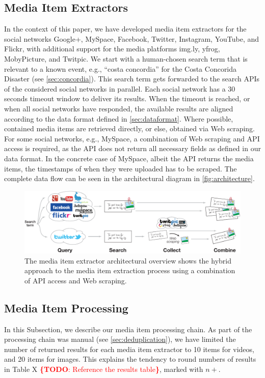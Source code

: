 \documentclass{acm_proc_article-sp}
\newcommand{\todo}[1]{\noindent\textcolor{red}{{\bf \{TODO}: #1{\bf \}}}}
\begin{document}
\subsection{Media Item Extractors}
In the context of this paper, we have developed media item extractors for the social networks Google+, MySpace, Facebook, Twitter, Instagram, YouTube, and Flickr,
with additional support for the media platforms img.ly, yfrog, MobyPicture, and Twitpic.
We start with a human-chosen search term that is relevant to a known event, e.g., ``costa concordia'' for the Costa Concorida Disaster (see \autoref{sec:concordia}).
This search term gets forwarded to the search APIs of the considered social networks in parallel.
Each social network has a 30 seconds timeout window to deliver its results.
When the timeout is reached, or when all social networks have responded,
the available results are aligned according to the data format defined in \autoref{sec:dataformat}.
Where possible, contained media items are retrieved directly,
or else, obtained via Web scraping.
For some social networks, e.g., MySpace, a combination of Web scraping and API access is required,
as the API does not return all necessary fields as defined in our data format.
In the concrete case of MySpace, albeit the API returns the media items,
the timestamps of when they were uploaded has to be scraped.
The complete data flow can be seen in the architectural diagram in \autoref{fig:architecture}.

\begin{figure}
\centering
\includegraphics[width=1.0\linewidth]{./resources/architecture.pdf}
\caption{The media item extractor architectural overview shows the hybrid approach to the media item extraction process using a combination of API access and Web scraping.}
\label{fig:architecture}
\end{figure}

\subsection{Media Item Processing}
In this Subsection, we describe our media item processing chain.
As part of the processing chain was manual (see \autoref{sec:deduplication}),
we have limited the number of returned results for each media item extractor to 10 items for videos, and 20 items for images.
This explains the tendency to round numbers of results in Table X \todo{Reference the results table}, marked with $n+$.
\end{document}
